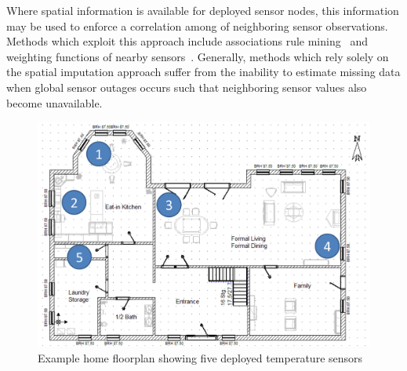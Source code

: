 Where spatial information is available for deployed sensor nodes, this information may be used to enforce a correlation among of neighboring sensor observations.
Methods which exploit this approach include associations rule mining~\cite{le2005estimating,jiang2007estimating} and weighting functions of nearby sensors~\cite{li2008spatial,li2008data,pan2010k}.
Generally, methods which rely solely on the spatial imputation approach suffer from the inability to estimate missing data when global sensor outages occurs such that neighboring sensor values also become unavailable.

\begin{figure}[H]
\centering
\includegraphics[scale=0.35]{house_floorplan.png}
\caption{Example home floorplan showing five deployed temperature sensors} \label{house_floorplan}
\end{figure}

